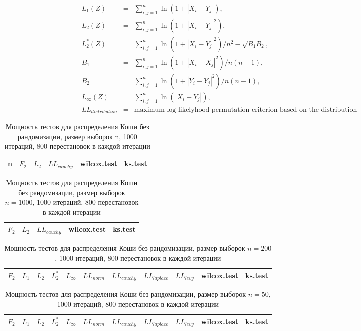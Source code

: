 \documentclass{article}
\begin{document}
\begin{eqnarray}
  L_1(Z)&=&\sum_{i,j=1}^{n}{\ln(1+|X_{i}-Y_{j}|)},\\
  L_2(Z)&=&\sum_{i,j=1}^{n}{\ln(1+|X_{i}-Y_{j}|^2)},\\
  L_2^*(Z)&=&\sum_{i,j=1}^{n}{\ln(1+|X_{i}-Y_{j}|^2)}/n^2-\sqrt{B_1 B_2},\\
  B_1 &=& \sum_{i,j=1}^{n}{\ln(1+|X_{i}-X_{j}|^2)}/n(n-1),\\
  B_2 &=& \sum_{i,j=1}^{n}{\ln(1+|Y_{i}-Y_{j}|^2)}/n(n-1),\\
  L_\infty(Z)&=&\sum_{i,j=1}^{n}{\ln(|X_{i}-Y_{j}|)},\\
  LL_{distribution} &=& \text{maximum log likelyhood permutation criterion based on the distribution}
\end{eqnarray}

\begin{longtable}{|c|c|c|c|c|c|}
  \caption{Мощность тестов для распределения Коши без рандомизации, размер выборок n, 1000 итераций, 800 перестановок в каждой итерации}
  \label{table:n50} \\
  \hline
  n & $F_2$ & $L_{2}$ & $LL_{cauchy}$ & wilcox.test & ks.test \\ \hline
  
  \hline
\end{longtable}

\begin{longtable}{|c|c|c|c|c|}
  \caption{Мощность тестов для распределения Коши без рандомизации, размер выборок $n=1000$, 1000 итераций, 800 перестановок в каждой итерации}
  \label{table:n50} \\
  \hline
  $F_2$ & $L_{2}$ & $LL_{cauchy}$ & wilcox.test & ks.test \\ \hline
  
  \hline
\end{longtable}

\begin{longtable}{|c|c|c|c|c|c|c|c|c|c|c|}
  \caption{Мощность тестов для распределения Коши без рандомизации, размер выборок $n=200$, 1000 итераций, 800 перестановок в каждой итерации}
  \label{table:n50} \\
  \hline
  $F_2$ & $L_{1}$ & $L_{2}$ & $L_2^*$ & $L_{\infty}$ & $LL_{norm}$ & $LL_{cauchy}$ & $LL_{laplace}$ & $LL_{levy}$ & wilcox.test & ks.test \\ \hline
  
\end{longtable}

\begin{longtable}{|c|c|c|c|c|c|c|c|c|c|c|}
  \caption{Мощность тестов для распределения Коши без рандомизации, размер выборок $n=50$, 1000 итераций, 800 перестановок в каждой итерации}
  \label{table:n50} \\
  \hline
  $F_2$ & $L_{1}$ & $L_{2}$ & $L_2^*$ & $L_{\infty}$ & $LL_{norm}$ & $LL_{cauchy}$ & $LL_{laplace}$ & $LL_{levy}$ & wilcox.test & ks.test \\ \hline
  
\end{longtable}
\end{document}
